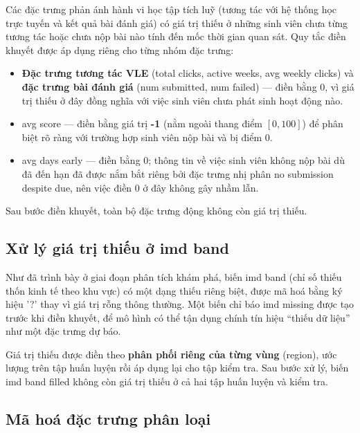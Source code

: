 \documentclass[a4paper]{article}
\newcommand{\code}[1]{{\ttfamily\def\_{\textunderscore\discretionary{}{}{}}#1}}
\def\code#1{#1}%
\def\_{ }%
\begin{document}
Các đặc trưng phản ánh hành vi học tập tích luỹ (tương tác với hệ thống học
trực tuyến và kết quả bài đánh giá) có giá trị thiếu ở những sinh viên chưa
từng tương tác hoặc chưa nộp bài nào tính đến mốc thời gian quan sát. Quy tắc
điền khuyết được áp dụng riêng cho từng nhóm đặc trưng:

\begin{itemize}[leftmargin=*]
  \item \textbf{Đặc trưng tương tác VLE} (\code{total\_clicks},
        \code{active\_weeks}, \code{avg\_weekly\_clicks}) và \textbf{đặc trưng
        bài đánh giá} (\code{num\_submitted}, \code{num\_failed}) --- điền bằng
        0, vì giá trị thiếu ở đây đồng nghĩa với việc sinh viên chưa phát sinh
        hoạt động nào.
  \item \code{avg\_score} --- điền bằng giá trị \textbf{-1} (nằm ngoài thang
        điểm $[0, 100]$) để phân biệt rõ ràng với trường hợp sinh viên nộp bài
        và bị điểm 0.
  \item \code{avg\_days\_early} --- điền bằng 0; thông tin về việc sinh viên
        không nộp bài dù đã đến hạn đã được nắm bắt riêng bởi đặc trưng nhị
        phân \code{no\_submission\_despite\_due}, nên việc điền 0 ở đây không
        gây nhầm lẫn.
\end{itemize}

Sau bước điền khuyết, toàn bộ đặc trưng động không còn giá trị thiếu.

\subsection{Xử lý giá trị thiếu ở \code{imd\_band}}

Như đã trình bày ở giai đoạn phân tích khám phá, biến \code{imd\_band} (chỉ số
thiếu thốn kinh tế theo khu vực) có một dạng thiếu riêng biệt, được mã hoá bằng
ký hiệu \code{'?'} thay vì giá trị rỗng thông thường. Một biến chỉ báo
\code{imd\_missing} được tạo trước khi điền khuyết, để mô hình có thể tận dụng
chính tín hiệu ``thiếu dữ liệu'' như một đặc trưng dự báo.

Giá trị thiếu được điền theo \textbf{phân phối riêng của từng vùng}
(\code{region}), ước lượng trên tập huấn luyện rồi áp dụng lại cho tập kiểm
tra. Sau bước xử lý, biến \code{imd\_band\_filled} không còn giá trị thiếu ở
cả hai tập huấn luyện và kiểm tra.

\subsection{Mã hoá đặc trưng phân loại}
\end{document}
